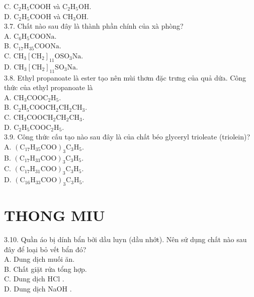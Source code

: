 \documentclass[10pt]{article}
\begin{document}
C. $\mathrm{C}_{2} \mathrm{H}_{5} \mathrm{COOH}$ và $\mathrm{C}_{2} \mathrm{H}_{5} \mathrm{OH}$.\\
D. $\mathrm{C}_{2} \mathrm{H}_{5} \mathrm{COOH}$ và $\mathrm{CH}_{3} \mathrm{OH}$.\\
3.7. Chất nào sau đây là thành phần chính của xà phòng?\\
A. $\mathrm{C}_{6} \mathrm{H}_{5} \mathrm{COONa}$.\\
B. $\mathrm{C}_{17} \mathrm{H}_{35} \mathrm{COONa}$.\\
C. $\mathrm{CH}_{3}\left[\mathrm{CH}_{2}\right]_{11} \mathrm{OSO}_{3} \mathrm{Na}$.\\
D. $\mathrm{CH}_{3}\left[\mathrm{CH}_{2}\right]_{11} \mathrm{SO}_{3} \mathrm{Na}$.\\
3.8. Ethyl propanoate là ester tạo nên mùi thơm đặc trưng của quả dứa. Công thức của ethyl propanoate là\\
A. $\mathrm{CH}_{3} \mathrm{COOC}_{2} \mathrm{H}_{5}$.\\
B. $\mathrm{C}_{2} \mathrm{H}_{5} \mathrm{COOCH}_{2} \mathrm{CH}_{2} \mathrm{CH}_{3}$.\\
C. $\mathrm{CH}_{3} \mathrm{COOCH}_{2} \mathrm{CH}_{2} \mathrm{CH}_{3}$.\\
D. $\mathrm{C}_{2} \mathrm{H}_{5} \mathrm{COOC}_{2} \mathrm{H}_{5}$.\\
3.9. Công thức cấu tạo nào sau đây là của chất béo glyceryl trioleate (triolein)?\\
A. $\left(\mathrm{C}_{17} \mathrm{H}_{35} \mathrm{COO}\right)_{3} \mathrm{C}_{3} \mathrm{H}_{5}$.\\
B. $\left(\mathrm{C}_{17} \mathrm{H}_{33} \mathrm{COO}\right)_{3} \mathrm{C}_{3} \mathrm{H}_{5}$.\\
C. $\left(\mathrm{C}_{17} \mathrm{H}_{31} \mathrm{COO}\right)_{3} \mathrm{C}_{3} \mathrm{H}_{5}$.\\
D. $\left(\mathrm{C}_{16} \mathrm{H}_{33} \mathrm{COO}\right)_{3} \mathrm{C}_{3} \mathrm{H}_{5}$.

\section*{THONG MIU}
3.10. Quần áo bị dính bẩn bởi dầu luyn (dầu nhớt). Nên sử dụng chất nào sau đây để loại bỏ vết bẩn đó?\\
A. Dung dịch muối ăn.\\
B. Chất giặt rửa tổng hợp.\\
C. Dung dịch HCl .\\
D. Dung dịch NaOH .
\end{document}
